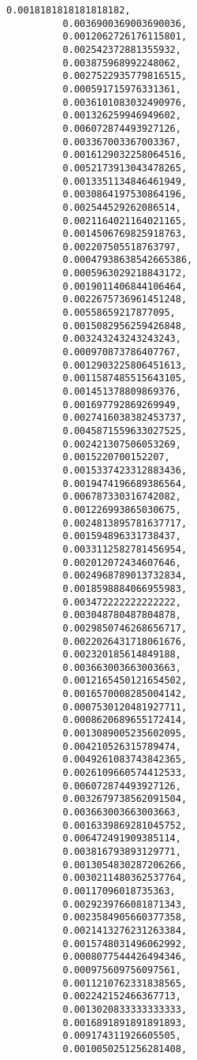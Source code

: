 \documentclass[11pt]{article}
\begin{document}
\begin{Verbatim}[commandchars=\\\{\}]
          0.0018181818181818182,
          0.0036900369003690036,
          0.0012062726176115801,
          0.002542372881355932,
          0.003875968992248062,
          0.0027522935779816515,
          0.000591715976331361,
          0.0036101083032490976,
          0.001326259946949602,
          0.006072874493927126,
          0.003367003367003367,
          0.0016129032258064516,
          0.0052173913043478265,
          0.0013351134846461949,
          0.0030864197530864196,
          0.002544529262086514,
          0.0021164021164021165,
          0.0014506769825918763,
          0.002207505518763797,
          0.00047938638542665386,
          0.0005963029218843172,
          0.0019011406844106464,
          0.0022675736961451248,
          0.00558659217877095,
          0.0015082956259426848,
          0.003243243243243243,
          0.000970873786407767,
          0.0012903225806451613,
          0.0011587485515643105,
          0.001451378809869376,
          0.001697792869269949,
          0.0027416038382453737,
          0.0045871559633027525,
          0.002421307506053269,
          0.0015220700152207,
          0.0015337423312883436,
          0.0019474196689386564,
          0.006787330316742082,
          0.001226993865030675,
          0.0024813895781637717,
          0.001594896331738437,
          0.0033112582781456954,
          0.002012072434607646,
          0.0024968789013732834,
          0.0018598884066955983,
          0.003472222222222222,
          0.003048780487804878,
          0.0029850746268656717,
          0.0022026431718061676,
          0.002320185614849188,
          0.003663003663003663,
          0.0012165450121654502,
          0.0016570008285004142,
          0.0007530120481927711,
          0.0008620689655172414,
          0.0013089005235602095,
          0.004210526315789474,
          0.0049261083743842365,
          0.0026109660574412533,
          0.006072874493927126,
          0.0032679738562091504,
          0.003663003663003663,
          0.0016339869281045752,
          0.006472491909385114,
          0.003816793893129771,
          0.0013054830287206266,
          0.0030211480362537764,
          0.00117096018735363,
          0.0029239766081871343,
          0.0023584905660377358,
          0.0021413276231263384,
          0.0015748031496062992,
          0.0008077544426494346,
          0.000975609756097561,
          0.0011210762331838565,
          0.002242152466367713,
          0.0013020833333333333,
          0.0016891891891891893,
          0.009174311926605505,
          0.0010050251256281408,

\end{Verbatim}
\end{document}
